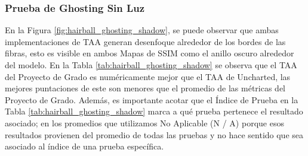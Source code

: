 \documentclass[pregrado]{tesis-usb} %
\begin{document}
\FloatBarrier

\subsubsection{Prueba de Ghosting Sin Luz}
En la Figura \ref{fig:hairball_ghosting_shadow}, se puede observar que ambas implementaciones de TAA generan desenfoque alrededor de los bordes de las fibras, esto es visible en ambos Mapas de SSIM como el anillo oscuro alrededor del modelo. En la Tabla \ref{tab:hairball_ghosting_shadow} se observa que el TAA del Proyecto de Grado es numéricamente mejor que el TAA de Uncharted, las mejores puntaciones de este son menores que el promedio de las métricas del Proyecto de Grado. Además, es importante acotar que el Índice de Prueba en la Tabla \ref{tab:hairball_ghosting_shadow} marca a qué prueba pertenece el resultado asociado; en los promedios que utilizamos No Aplicable (N / A) porque esos resultados provienen del promedio de todas las pruebas y no hace sentido que sea asociado al índice de una prueba específica. 
\end{document}
